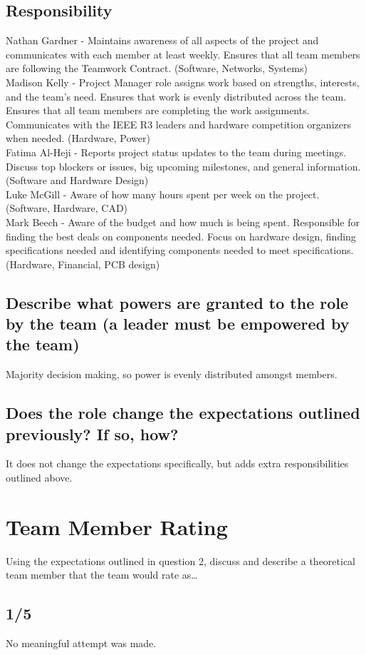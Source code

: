 \documentclass[conference]{IEEEtran}
\begin{document}
\subsection{Responsibility}
Nathan Gardner - Maintains awareness of all aspects of the project and communicates with each member at least weekly. Ensures that all team members are following the Teamwork Contract. (Software, Networks, Systems)\\
Madison Kelly - Project Manager role assigns work based on strengths, interests, and the team's need. Ensures that work is evenly distributed across the team. Ensures that all team members are completing the work assignments. Communicates with the IEEE R3 leaders and hardware competition organizers when needed. (Hardware, Power)\\
Fatima Al-Heji - Reports project status updates to the team during meetings. Discuss top blockers or issues, big upcoming milestones, and general information. (Software and Hardware Design)\\
Luke McGill - Aware of how many hours spent per week on the project. (Software, Hardware, CAD)\\
Mark Beech - Aware of the budget and how much is being spent. Responsible for finding the best deals on components needed. Focus on hardware design, finding specifications needed and identifying components needed to meet specifications. (Hardware, Financial, PCB design)\\
\subsection{Describe what powers are granted to the role by the team (a leader must be empowered by the team)}
Majority decision making, so power is evenly distributed amongst members. 
\subsection{Does the role change the expectations outlined previously? If so, how?}
It does not change the expectations specifically, but adds extra responsibilities outlined above. 
\section{Team Member Rating}
Using the expectations outlined in question 2, discuss and describe a theoretical team member that the team would rate as…

\subsection{1/5}
No meaningful attempt was made.
\end{document}
